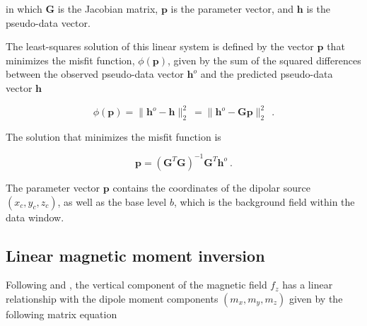     \noindent
    in which $\mathbf{G}$ is the Jacobian matrix, $\mathbf{p}$ is the parameter vector, and $\mathbf{h}$ is the pseudo-data vector.

    The least-squares solution of this linear system is defined by the vector $\mathbf{p}$ that minimizes the misfit function, $\phi(\mathbf{p})$, given by the sum of the squared differences between the observed pseudo-data vector $\mathbf{h}^o$ and the predicted pseudo-data vector $\mathbf{h}$

    \begin{equation}
    \label{function_phi}
    \phi(\mathbf{p})
    = \| \mathbf{h}^o - \mathbf{h} \|_2^2\
    = \| \mathbf{h}^o - \mathbf{G}\mathbf{p} \|_2^2\
    \ .
    \end{equation}

    \noindent
    The solution that minimizes the misfit function is

    \begin{equation}
    \label{euler_solution}
    \mathbf{p} = \left(\mathbf{G}^T \mathbf{G}\right)^{-1} \mathbf{G}^T \mathbf{h}^o\ .
    \end{equation}

    \noindent
    The parameter vector $\mathbf{p}$ contains the coordinates of the dipolar source $(x_c, y_c, z_c)$, as well as the base level $b$, which is the background field within the data window.

\subsection{Linear magnetic moment inversion}

     Following \citet{Oliveira2015Estimation} and \citet{Souza-Junior2024}, the vertical component of the magnetic field $f_z$ has a linear relationship with the dipole moment components $(m_x, m_y, m_z)$ given by the following matrix equation

